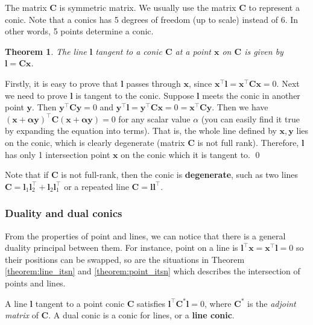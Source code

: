 \documentclass[12pt]{article}
\newtheorem{theorem}{Theorem}[section]
\numberwithin{equation}{section}
\renewenvironment{proof}{{\bfseries Proof.}}{\qed \\}
\begin{document}
The matrix $\mathbf{C}$ is symmetric matrix. We usually use the matrix $\mathbf{C}$ to represent a conic. Note that a conics has 5 degrees of freedom (up to scale) instead of 6. In other words, 5 points determine a conic.

\begin{theorem}
The line $\mathbf{l}$ tangent to a conic $\mathbf{C}$ at a point $\mathbf{x}$ on $\mathbf{C}$ is given by $\mathbf{l} = \mathbf{Cx}$.
\label{theorem:conic}
\end{theorem}
\begin{proof}
Firstly, it is easy to prove that $\mathbf{l}$ passes through $\mathbf{x}$, since $\mathbf{x^\top l = x^\top Cx} = 0$. Next we need to prove $\mathbf{l}$ is tangent to the conic. Suppose $\mathbf{l}$ meets the conic in another point $\mathbf{y}$. Then $\mathbf{y^\top Cy} = 0$ and $\mathbf{ y^\top l = y^\top Cx } = 0 = \mathbf{x^\top Cy }$. Then we have $(\mathbf{x + \alpha y})^\top \mathbf{C} (\mathbf{x + \alpha y}) = 0$ for any scalar value $\alpha$ (you can easily find it true by expanding the equation into terms). That is, the whole line defined by $\mathbf{x, y}$ lies on the conic, which is clearly degenerate (matrix $\mathbf{C}$ is not full rank). Therefore, $\mathbf{l}$ has only 1 intersection point $\mathbf{x}$ on the conic which it is tangent to.
\end{proof}

Note that if $\mathbf{C}$ is not full-rank, then the conic is \textbf{degenerate}, such as two lines $\mathbf{C} = \mathbf{l}_1\mathbf{l}_2^\top + \mathbf{l}_2\mathbf{l}_1^\top$ or a repeated line  $\mathbf{C} = \mathbf{l}\mathbf{l}^\top$.

\subsubsection{Duality and dual conics}
\label{sec:dual_conic}

From the properties of point and lines, we can notice that there is a general duality principal between them. For instance, point on a line is $\mathbf{l^\top x} = \mathbf{x^\top l} = 0$ so their positions can be swapped, so are the situations in Theorem \ref{theorem:line_itsn} and \ref{theorem:point_itsn} which describes the intersection of points and lines. 

A line $\mathbf{l}$ tangent to a point conic $\mathbf{C}$ satisfies $\mathbf{l^\top C^* l} = 0$, where $\mathbf{C}^*$ is the \textit{adjoint matrix} of $\mathbf{C}$. A dual conic is a conic for lines, or a \textbf{line conic}.
\end{document}
